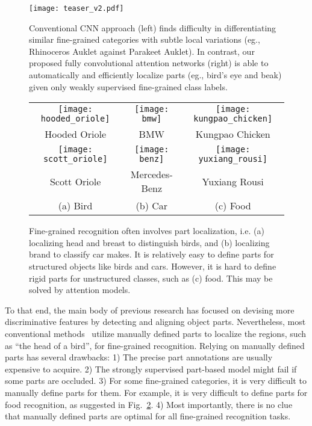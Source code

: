 \documentclass[10pt,twocolumn,letterpaper]{article}
\begin{document}
\begin{figure}
\begin{center}
\texttt{[image: teaser\_v2.pdf]}
\end{center}
\caption{Conventional CNN approach (left) finds difficulty in differentiating similar fine-grained categories with subtle local variations (eg., Rhinoceros Auklet against Parakeet Auklet).
In contrast, our proposed fully convolutional attention networks (right) is able to automatically and efficiently localize parts (eg., bird's eye and beak) given only weakly supervised fine-grained class labels.
}
\label{fig:teaser}
\end{figure}

\setlength{\tabcolsep}{0.5pt}
\begin{figure}[t]
\begin{center}
\begin{tabular}{ccc}
\texttt{[image: hooded\_oriole]} &
\texttt{[image: bmw]} &
\texttt{[image: kungpao\_chicken]} \\
\vspace{2pt}
Hooded Oriole & BMW & Kungpao Chicken \\
\texttt{[image: scott\_oriole]} &
\texttt{[image: benz]} &
\texttt{[image: yuxiang\_rousi]} \\
Scott Oriole & Mercedes-Benz & Yuxiang Rousi \\
(a) Bird & (b) Car & (c) Food
\end{tabular}
\end{center}
\caption{Fine-grained recognition often involves part localization, i.e. (a) localizing head and breast to distinguish birds, and (b) localizing brand to classify car makes.
It is relatively easy to define parts for structured objects like birds and cars.
However, it is hard to define rigid parts for unstructured classes, such as (c) food.
This may be solved by attention models.
}
\label{fig:teaser2}
\end{figure}

To that end, the main body of previous research has focused on devising more discriminative features by detecting and aligning object parts.
Nevertheless, most conventional methods~\cite{liu2012dog, branson2014bird} utilize manually defined parts to localize the regions, such as ``the head of a bird'', for fine-grained recognition.
Relying on manually defined parts has several drawbacks:
1) The precise part annotations are usually expensive to acquire.
2) The strongly supervised part-based model might fail if some parts are occluded.
3) For some fine-grained categories, it is very difficult to manually define parts for them.
For example, it is very difficult to define parts for food recognition, as suggested in Fig.~\ref{fig:teaser2}.
4) Most importantly, there is no clue that manually defined parts are optimal for all fine-grained recognition tasks.
\end{document}
